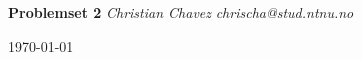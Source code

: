 \documentclass[fontsize=11pt, paper=a4]{article}
\begin{document}
\begin{titlepage}
	\begin{center}
		\Large\textbf{Problemset 2}\newline
		\newline\newline
		\large\textit{Christian Chavez}\newline
		\textit{chrischa@stud.ntnu.no}\newline
		\newline\newline
	\end{center}
	\today
\end{titlepage}
\end{document}
